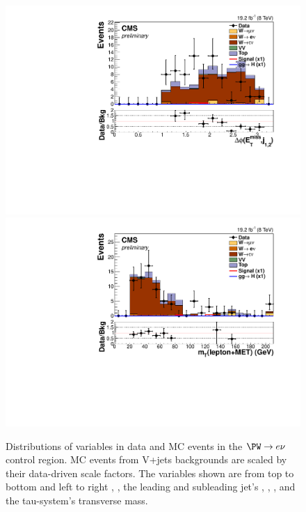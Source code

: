 \begin{figure}
  \includegraphics[width=.65\largefigwidth]{plots/parked/HIG-14-038-figs/output_sigreg/taunu_jetmetnomu_mindphi.pdf}
  \includegraphics[width=.65\largefigwidth]{plots/parked/HIG-14-038-figs/output_sigreg/taunu_lep_mt.pdf}
  \caption{Distributions of variables in data and \ac{MC} events in the $\PW\rightarrow e\nu$ control region. \ac{MC} events from V+jets backgrounds are scaled by their data-driven scale factors. The variables shown are from top to bottom and left to right \detajj, \Mjj, the leading and subleading jet's \pt, \METnoMU, \METsig, \jetmetdphileading and the tau-\MET system's transverse mass.}
  \label{fig:parkedwtaunu}
\end{figure}

